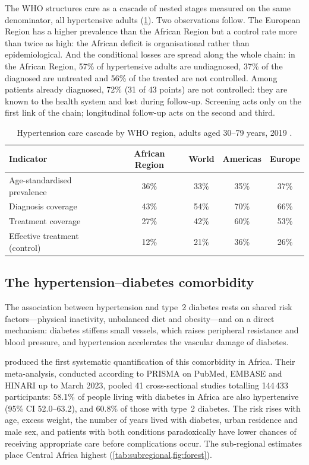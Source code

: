 \documentclass[11pt,a4paper,oneside]{report}
\begin{document}
The WHO structures care as a cascade of nested stages measured on the same denominator, all hypertensive adults (\cref{tab:cascade}). Two observations follow. The European Region has a higher prevalence than the African Region but a control rate more than twice as high: the African deficit is organisational rather than epidemiological. And the conditional losses are spread along the whole chain: in the African Region, 57\% of hypertensive adults are undiagnosed, 37\% of the diagnosed are untreated and 56\% of the treated are not controlled. Among patients already diagnosed, 72\% (31 of 43 points) are not controlled: they are known to the health system and lost during follow-up. Screening acts only on the first link of the chain; longitudinal follow-up acts on the second and third.

\begin{table}[htbp]
\centering\small
\caption{Hypertension care cascade by WHO region, adults aged 30--79 years, 2019 \parencite{who2023hypertension}.}\label{tab:cascade}
\begin{tabular}{@{}lcccc@{}}
\toprule
\textbf{Indicator} & \textbf{African Region} & \textbf{World} & \textbf{Americas} & \textbf{Europe} \\
\midrule
Age-standardised prevalence & 36\% & 33\% & 35\% & 37\% \\
Diagnosis coverage & 43\% & 54\% & 70\% & 66\% \\
Treatment coverage & 27\% & 42\% & 60\% & 53\% \\
Effective treatment (control) & 12\% & 21\% & 36\% & 26\% \\
\bottomrule
\end{tabular}
\end{table}

\subsection{The hypertension--diabetes comorbidity}\label{sec:comorbidity}

The association between hypertension and type~2 diabetes rests on shared risk factors---physical inactivity, unbalanced diet and obesity---and on a direct mechanism: diabetes stiffens small vessels, which raises peripheral resistance and blood pressure, and hypertension accelerates the vascular damage of diabetes.

\Textcite{hinneh2023} produced the first systematic quantification of this comorbidity in Africa. Their meta-analysis, conducted according to PRISMA on PubMed, EMBASE and HINARI up to March 2023, pooled 41 cross-sectional studies totalling 144\,433 participants: 58.1\% of people living with diabetes in Africa are also hypertensive (95\% CI 52.0--63.2), and 60.8\% of those with type~2 diabetes. The risk rises with age, excess weight, the number of years lived with diabetes, urban residence and male sex, and patients with both conditions paradoxically have lower chances of receiving appropriate care before complications occur. The sub-regional estimates place Central Africa highest (\cref{tab:subregional,fig:forest}).
\end{document}
